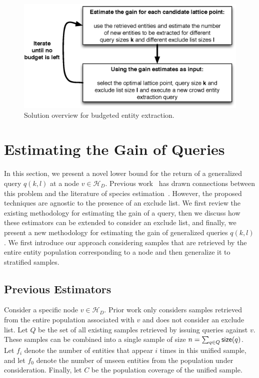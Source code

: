 \documentclass{vldb}
\newcommand{\hierarchy}{\mathcal{H}_D}
\begin{document}
\begin{figure}
	\begin{center}
	\includegraphics[clip,scale=0.45]{figs/framework.eps}
	\caption{Solution overview for budgeted entity extraction.}
	\label{fig:framework}
	\end{center}
	\vspace{-10pt}
\end{figure}

\section{Estimating the Gain of Queries}
\label{sec:gainestimators}
In this section, we present a novel lower bound for the return of a generalized query $q(k,l)$ at a node $v \in \hierarchy$. Previous work~\cite{trushkowsky:2013} has drawn connections between this problem and the literature of species estimation~\cite{chao:1992}. However,  the proposed techniques are agnostic to the presence of an exclude list. We first review the existing methodology for estimating the gain of a query, then we discuss how these estimators can be extended to consider an exclude list, and finally, we present a new methodology for estimating the gain of generalized queries $q(k,l)$. We first introduce our approach considering samples that are retrieved by the entire entity population corresponding to a node and then generalize it to stratified samples.

\subsection{Previous Estimators} 
Consider a specific node $v \in \hierarchy$. Prior work only considers samples retrieved from the entire population associated with $v$ and does not consider an exclude list. Let $Q$ be the set of all existing samples retrieved by issuing queries against $v$. These samples can be combined into a single sample of size $n = \sum_{q \in Q} {\sf size}(q)$. Let $f_i$ denote the number of entities that appear $i$ times in this unified sample, and let $f_0$ denote the number of unseen entities from the population under consideration. Finally, let $C$ be the population coverage of the unified sample.
\end{document}
